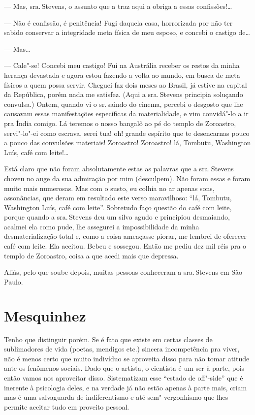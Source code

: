 --- Mas, sra.\,Stevens, o assunto que a traz aqui a obriga a essas
confissões!\ldots{}

--- Não é confissão, é penitência! Fugi daquela casa, horrorizada por
não ter sabido conservar a integridade meta física de meu esposo, e
concebi o castigo de\ldots{}

--- Mas\ldots{}

--- Cale"-se! Concebi meu castigo! Fui na Austrália receber os restos da
minha herança devastada e agora estou fazendo a volta ao mundo, em busca
de meta físicos a quem possa servir. Cheguei faz dois meses ao Brasil,
já estive na capital da República, porém nada me satisfez. (Aqui a sra.\,Stevens principia soluçando convulsa.) Ontem, quando vi o sr.\,saindo do
cinema, percebi o desgosto que lhe causavam essas manifestações
específicas da materialidade, e vim convidá"-lo a ir pra Índia comigo. Lá
teremos o nosso bangalô ao pé do templo de Zoroastro, servi"-lo"-ei como
escrava, serei tua! oh! grande espírito que te desencarnas pouco a pouco
das convulsões materiais! Zoroastro! Zoroastro! lá, Tombutu, Washington
Luís, café com leite!\ldots{}

Está claro que não foram absolutamente estas as palavras que a sra.\,Stevens choveu no auge da sua admiração por mim (desculpem). Não foram
essas e foram muito mais numerosas. Mas com o susto, eu colhia no ar
apenas sons, assonâncias, que deram em resultado este verso maravilhoso:
``lá, Tombutu, Washington Luís, café com leite''. Sobretudo faço questão
do café com leite, porque quando a sra.\,Stevens deu um silvo agudo e
principiou desmaiando, acalmei ela como pude, lhe assegurei a
impossibilidade da minha desmaterialização total e, como a coisa
ameaçasse piorar, me lembrei de oferecer café com leite. Ela aceitou.
Bebeu e sossegou. Então me pediu dez mil réis pra o templo de Zoroastro,
coisa a que acedi mais que depressa.

Aliás, pelo que soube depois, muitas pessoas conheceram a sra.\,Stevens
em São Paulo.

\chapter{Mesquinhez}

Tenho que distinguir porém. Se é fato que existe em certas classes de
sublimadores de vida (poetas, mendigos etc.) sincera incompetência pra
viver, não é menos certo que muito indivíduo se aproveita disso para não
tomar atitude ante os fenômenos sociais. Dado que o artista, o cientista
é um ser à parte, pois então vamos nos aproveitar disso. Sistematizam
esse ``estado de off"-side'' que é inerente à psicologia deles, e na
verdade já não estão apenas à parte mais, criam mas é uma salvaguarda de
indiferentismo e até sem"-vergonhismo que lhes permite aceitar tudo em
proveito pessoal.


